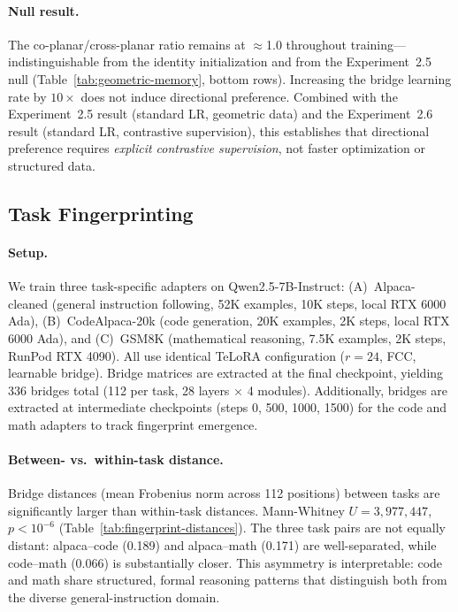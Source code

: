 \paragraph{Null result.}
The co-planar/cross-planar ratio remains at $\approx$1.0 throughout
training---indistinguishable from the identity initialization and from
the Experiment~2.5 null (Table~\ref{tab:geometric-memory}, bottom rows).
Increasing the bridge learning rate by $10\times$ does not induce
directional preference. Combined with the Experiment~2.5 result (standard
LR, geometric data) and the Experiment~2.6 result (standard LR,
contrastive supervision), this establishes that directional preference
requires \emph{explicit contrastive supervision}, not faster optimization
or structured data.

\subsection{Task Fingerprinting}
\label{sec:exp-fingerprint}

\paragraph{Setup.}
We train three task-specific adapters on Qwen2.5-7B-Instruct:
(A)~Alpaca-cleaned (general instruction following, 52K examples, 10K steps,
local RTX 6000 Ada), (B)~CodeAlpaca-20k (code generation, 20K examples,
2K steps, local RTX 6000 Ada), and (C)~GSM8K (mathematical reasoning, 7.5K
examples, 2K steps, RunPod RTX 4090). All use identical TeLoRA
configuration ($r\!=\!24$, FCC, learnable bridge). Bridge matrices are
extracted at the final checkpoint, yielding 336 bridges total (112 per task,
28 layers $\times$ 4 modules). Additionally, bridges are extracted at
intermediate checkpoints (steps 0, 500, 1000, 1500) for the code and math
adapters to track fingerprint emergence.

\paragraph{Between- vs.\ within-task distance.}
Bridge distances (mean Frobenius norm across 112 positions) between tasks
are significantly larger than within-task distances. Mann-Whitney $U =
3{,}977{,}447$, $p < 10^{-6}$ (Table~\ref{tab:fingerprint-distances}).
The three task pairs are not equally distant: alpaca--code (0.189) and
alpaca--math (0.171) are well-separated, while code--math (0.066) is
substantially closer. This asymmetry is interpretable: code and math share
structured, formal reasoning patterns that distinguish both from the diverse
general-instruction domain.

